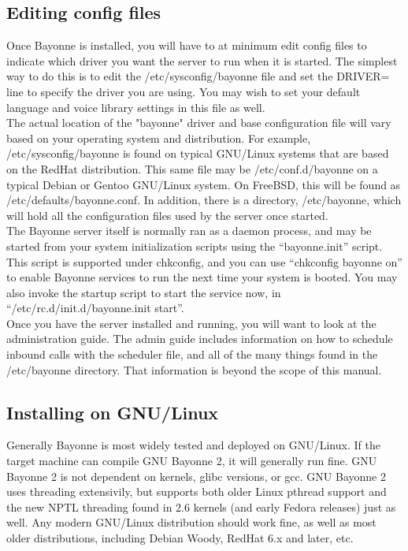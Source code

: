 \documentclass[a4paper,12pt]{article}
\begin{document}
\subsection{Editing config files}

Once Bayonne is installed, you will have to at minimum edit config files 
to indicate which driver you want the server to run when it is started. 
The simplest way to do this is to edit the /etc/sysconfig/bayonne file and
set the DRIVER= line to specify the driver you are using.  You may wish to
set your default language and voice library settings in this file as well. \\

The actual location of the "bayonne" driver and base configuration file
will vary based on your operating system and distribution.  For example,
/etc/sysconfig/bayonne is found on typical GNU/Linux systems that are based
on the RedHat distribution.  This same file may be /etc/conf.d/bayonne on
a typical Debian or Gentoo GNU/Linux system.  On FreeBSD, this will be found
as /etc/defaults/bayonne.conf.  In addition, there is a directory,
/etc/bayonne, which will hold all the configuration files used by the
server once started. \\

The Bayonne server itself is normally ran as a daemon process, and may
be started from your system initialization scripts using the
``bayonne.init'' script.  This script is supported under chkconfig, and
you can use ``chkconfig bayonne on'' to enable Bayonne services to run
the next time your system is booted.  You may also invoke the startup
script to start the service now, in ``/etc/rc.d/init.d/bayonne.init
start''. \\

Once you have the server installed and running, you will want to look at
the administration guide.  The admin guide includes information on how to
schedule inbound calls with the scheduler file, and all of the many things
found in the /etc/bayonne directory.  That information is beyond the scope of
this manual. \\

\subsection{Installing on GNU/Linux}

Generally Bayonne is most widely tested and deployed on GNU/Linux.  If
the target machine can compile GNU Bayonne 2, it will generally run fine.
GNU Bayonne 2 is not dependent on kernels, glibc versions, or gcc.  GNU
Bayonne 2 uses threading extensivily, but supports both older Linux
pthread support and the new NPTL threading found in 2.6 kernels (and
early Fedora releases) just as well.  Any modern GNU/Linux distribution
should work fine, as well as most older distributions, including Debian
Woody, RedHat 6.x and later, etc. \\
\end{document}
